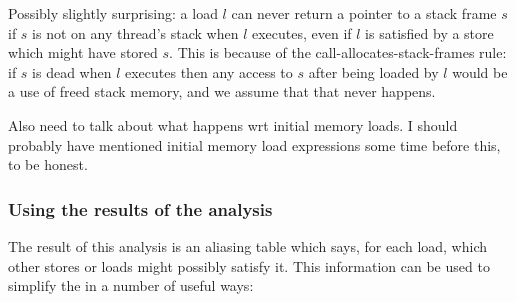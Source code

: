 Possibly slightly surprising: a load $l$ can never return a pointer to
a stack frame $s$ if $s$ is not on any thread's stack when $l$
executes, even if $l$ is satisfied by a store which might have stored
$s$.  This is because of the call-allocates-stack-frames rule: if $s$
is dead when $l$ executes then any access to $s$ after being loaded by
$l$ would be a use of freed stack memory, and we assume that that
never happens. 

Also need to talk about what happens wrt initial memory loads.  I
should probably have mentioned initial memory load expressions some
time before this, to be honest.

\subsubsection{Using the results of the analysis}

The result of this analysis is an aliasing table which says, for each
load, which other stores or loads might possibly satisfy it.  This
information can be used to simplify the {\StateMachine} in a number of
useful ways:

